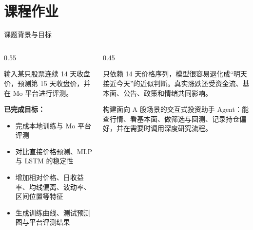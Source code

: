 \documentclass[10pt,aspectratio=43]{beamer}
\begin{document}
\section{课程作业}

\begin{frame}{课题背景与目标}
  \begin{columns}[T]
    \begin{column}{0.55\textwidth}
      \begin{hlbox}[title=课程任务]
        \footnotesize
        输入某只股票连续 14 天收盘价，预测第 15 天收盘价，并在 Mo 平台进行评测。
      \end{hlbox}
      \vspace{0.45em}
      \textbf{已完成目标：}
      \begin{itemize}\footnotesize
        \item 完成本地训练与 Mo 平台评测
        \item 对比直接价格预测、MLP 与 LSTM 的稳定性
        \item 增加相对价格、日收益率、均线偏离、波动率、区间位置等特征
        \item 生成训练曲线、测试预测图与平台评测结果
      \end{itemize}
    \end{column}
    \begin{column}{0.45\textwidth}
      \begin{orangebox}[title=为什么要扩展成 Agent]
        \footnotesize
        只依赖 14 天价格序列，模型很容易退化成“明天接近今天”的近似判断。真实涨跌还受资金流、基本面、公告、政策和情绪共同影响。
      \end{orangebox}
      \vspace{0.45em}
      \begin{greenbox}[title=扩展目标]
        \footnotesize
        构建面向 A 股场景的交互式投资助手 Agent：能查行情、看基本面、做筛选与回测、记录持仓偏好，并在需要时调用深度研究流程。
      \end{greenbox}
    \end{column}
  \end{columns}
\end{frame}
\end{document}
